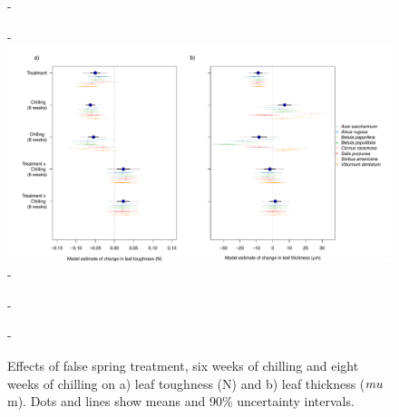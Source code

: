 \documentclass{article}\usepackage[]{graphicx}\usepackage[]{color}
\begin{document}
  {\begin{figure} [H]
  -\begin{center}
  -\includegraphics[width=18cm]{..//analyses/figures/mu_leaftraits.pdf} 
  -\caption{Effects of false spring treatment, six weeks of chilling and eight weeks of chilling on a) leaf toughness (N) and b) leaf thickness ($\\mu$m). Dots and lines show means and 90\% uncertainty intervals. }\label{fig:muleaf}
  -\end{center}
  -\end{figure}}
  
\end{document}
